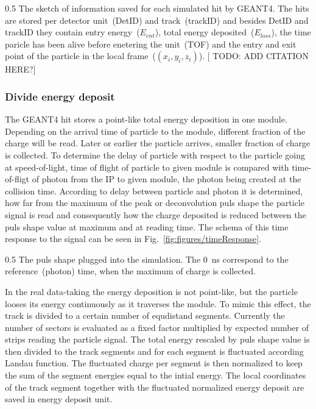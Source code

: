                  {0.5}       %
                 { The sketch of information saved for each simulated hit by GEANT4. The hits are stored per detector unit~(DetID) and track~(trackID) and besides DetID and trackID they contain entry energy~($E_{ent}$), total energy deposited~($E_{loss}$), the time paricle has been alive before enetering the unit~(TOF) and the entry and exit point of the particle in the local frame~($(x_{i},y_{i},z_{i})$). [ TODO: ADD CITATION HERE?]}

\subsubsection{Divide energy deposit}

The GEANT4 hit stores a point-like total energy deposition in one module. Depending on the arrival time of particle to the module, different fraction of the charge will be read. Later or earlier the particle arrives, smaller fraction of charge is collected. To determine the delay of particle with respect to the particle going at speed-of-light, time of flight of particle to given module is compared with time-of-fligt of photon from the IP to given module, the photon being created at the collision time. According to delay between particle and photon it is determined, how far from the maximum of the peak or deconvolution puls shape the particle signal is read and consequently how the charge deposited is reduced between the puls shape value at maximum and at reading time. The schema of this time response to the signal can be seen in Fig.~\ref{fig:figures/timeResponse}.


                 {0.5}       %
                 { The puls shape plugged into the simulation. The 0~ns correspond to the reference~(photon) time, when the maximum of charge is collected.}

In the real data-taking the energy deposition is not point-like, but the particle looses its energy continuously as it traverses the module. To mimic this effect, the track is divided to a certain number of equdistand segments. Currently the number of sectors is evaluated as a fixed factor multiplied by expected number of strips reading the particle signal. The total energy rescaled by puls shape value is then divided to the track segments and for each segment is fluctuated according Landau function. The fluctuated charge per segment is then normalized to keep the sum of the segment energies equal to the intial energy. The local coordinates of the track segment together with the fluctuated normalized energy deposit are saved in energy deposit unit.

